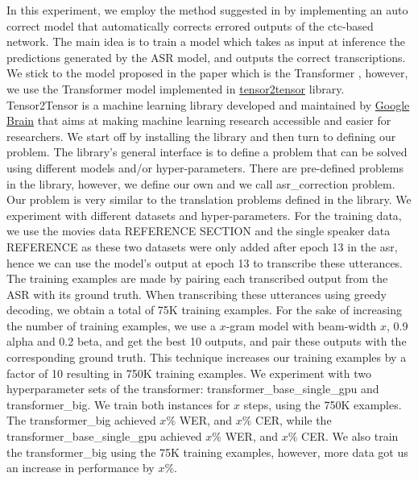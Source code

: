 In this experiment, we employ the method suggested in \cite{zhang2019automatic} by implementing an auto correct model that automatically corrects errored outputs of the ctc-based network. The main idea is to train a model which takes as input at inference the predictions generated by the \ac{ASR} model, and outputs the correct transcriptions. We stick to the model proposed in the paper \cite{zhang2019automatic} which is the Transformer \cite{vaswani2017attention}, however, we use the Transformer model implemented in \href{https://github.com/tensorflow/tensor2tensor}{tensor2tensor} library. \ac{Tensor2Tensor} is a machine learning library developed and maintained by \href{https://ai.google/research/teams/brain}{Google Brain} that aims at making machine learning research accessible and easier for researchers.
We start off by installing the library and then turn to defining our problem. The library's general interface is to define a problem that can be solved using different models and/or hyper-parameters. There are pre-defined problems in the library, however, we define our own and we call asr\_correction problem. Our problem is very similar to the translation problems defined in the library. We experiment with different datasets and hyper-parameters. For the training data, we use the movies data REFERENCE SECTION and the single speaker data REFERENCE as these two datasets were only added after epoch 13 in the asr, hence we can use the model's output at epoch 13 to transcribe these utterances. The training examples are made by pairing each transcribed output from the \ac{ASR} with its ground truth. When transcribing these utterances using greedy decoding, we obtain a total of 75K training examples.  For the sake of increasing the number of training examples, we use a $x$-gram model with beam-width $x$, 0.9 alpha and 0.2 beta, and get the best 10 outputs, and pair these outputs with the corresponding ground truth. This technique increases our training examples by a factor of 10 resulting in 750K training examples. We experiment with two hyperparameter sets of the transformer: transformer\_base\_single\_gpu and transformer\_big. We train both instances for $x$ steps, using the 750K examples. The transformer\_big achieved $x\%$ \ac{WER}, and $x\%$ \ac{CER}, while the transformer\_base\_single\_gpu  achieved $x\%$ \ac{WER}, and $x\%$ \ac{CER}. We also train the transformer\_big using the 75K training examples, however, more data got us an increase in performance by $x\%$.





